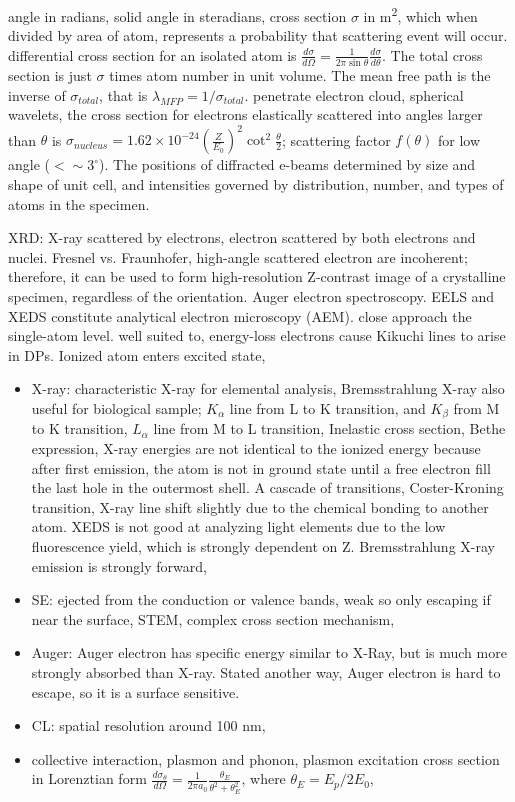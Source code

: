 angle in radians, solid angle in steradians, cross section $\sigma$ in \si{m^2}, which when divided by area of atom, represents a probability that scattering event will occur. differential cross section for an isolated atom is $\frac{d\sigma}{d\Omega} = \frac{1}{2\pi \sin\theta} \frac{d\sigma}{d\theta}$. The total cross section is just $\sigma$ times atom number in unit volume. The mean free path is the inverse of $\sigma_{total}$, that is $\lambda_{MFP} = 1/\sigma_{total}$. penetrate electron cloud, spherical wavelets, the cross section for electrons elastically scattered into angles larger than $\theta$ is $\sigma_{nucleus}= 1.62\times10^{-24} (\frac{Z}{E_0})^2\cot^2\frac{\theta}{2}$; scattering factor $f(\theta)$ for low angle ($< \sim 3^{\circ}$). The positions of diffracted e-beams determined by size and shape of unit cell, and intensities governed by distribution, number, and types of atoms in the specimen. 

XRD: X-ray scattered by electrons, electron scattered by both electrons and nuclei. Fresnel vs. Fraunhofer, high-angle scattered electron are incoherent; therefore, it can be used to form high-resolution Z-contrast image of a crystalline specimen, regardless of the orientation. Auger electron spectroscopy. EELS and XEDS constitute analytical electron microscopy (AEM). close approach the single-atom level. well suited to, energy-loss electrons cause Kikuchi lines to arise in DPs. Ionized atom enters excited state, 

\begin{itemize}
\item X-ray: characteristic X-ray for elemental analysis, Bremsstrahlung X-ray also useful for biological sample; $K_\alpha$ line from L to K transition, and $K_\beta$ from M to K transition, $L_\alpha$ line from M to L transition, Inelastic cross section, Bethe expression, X-ray energies are not identical to the ionized energy because after first emission, the atom is not in ground state until a free electron fill the last hole in the outermost shell. A cascade of transitions, Coster-Kroning transition, X-ray line shift slightly due to the chemical bonding to another atom. XEDS is not good at analyzing light elements due to the low fluorescence yield, which is strongly dependent on Z. Bremsstrahlung X-ray emission is strongly forward, 
\item SE: ejected from the conduction or valence bands, weak so only escaping if near the surface, STEM, complex cross section mechanism, 
\item Auger: Auger electron has specific energy similar to X-Ray, but is much more strongly absorbed than X-ray. Stated another way, Auger electron is hard to escape, so it is a surface sensitive. 
\item CL: spatial resolution around 100 nm, 
\item collective interaction, plasmon and phonon, plasmon excitation cross section in Lorenztian form $\frac{d\sigma_\theta}{d\Omega} = \frac{1}{2\pi a_0} \frac{\theta_E}{\theta^2 + \theta_E^2}$, where $\theta_E = E_p/2E_0$, 
\end{itemize}

